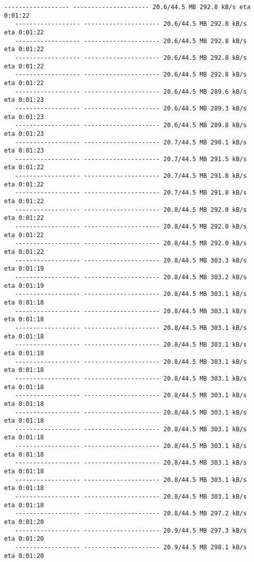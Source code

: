 \documentclass[11pt]{article}
\begin{document}
\begin{Verbatim}[commandchars=\\\{\}]
   ------------------ --------------------- 20.6/44.5 MB 292.8 kB/s eta 0:01:22
   ------------------ --------------------- 20.6/44.5 MB 292.8 kB/s eta 0:01:22
   ------------------ --------------------- 20.6/44.5 MB 292.8 kB/s eta 0:01:22
   ------------------ --------------------- 20.6/44.5 MB 292.8 kB/s eta 0:01:22
   ------------------ --------------------- 20.6/44.5 MB 292.8 kB/s eta 0:01:22
   ------------------ --------------------- 20.6/44.5 MB 289.6 kB/s eta 0:01:23
   ------------------ --------------------- 20.6/44.5 MB 289.3 kB/s eta 0:01:23
   ------------------ --------------------- 20.6/44.5 MB 289.8 kB/s eta 0:01:23
   ------------------ --------------------- 20.7/44.5 MB 290.1 kB/s eta 0:01:23
   ------------------ --------------------- 20.7/44.5 MB 291.5 kB/s eta 0:01:22
   ------------------ --------------------- 20.7/44.5 MB 291.8 kB/s eta 0:01:22
   ------------------ --------------------- 20.7/44.5 MB 291.8 kB/s eta 0:01:22
   ------------------ --------------------- 20.8/44.5 MB 292.0 kB/s eta 0:01:22
   ------------------ --------------------- 20.8/44.5 MB 292.0 kB/s eta 0:01:22
   ------------------ --------------------- 20.8/44.5 MB 292.0 kB/s eta 0:01:22
   ------------------ --------------------- 20.8/44.5 MB 303.3 kB/s eta 0:01:19
   ------------------ --------------------- 20.8/44.5 MB 303.2 kB/s eta 0:01:19
   ------------------ --------------------- 20.8/44.5 MB 303.1 kB/s eta 0:01:18
   ------------------ --------------------- 20.8/44.5 MB 303.1 kB/s eta 0:01:18
   ------------------ --------------------- 20.8/44.5 MB 303.1 kB/s eta 0:01:18
   ------------------ --------------------- 20.8/44.5 MB 303.1 kB/s eta 0:01:18
   ------------------ --------------------- 20.8/44.5 MB 303.1 kB/s eta 0:01:18
   ------------------ --------------------- 20.8/44.5 MB 303.1 kB/s eta 0:01:18
   ------------------ --------------------- 20.8/44.5 MB 303.1 kB/s eta 0:01:18
   ------------------ --------------------- 20.8/44.5 MB 303.1 kB/s eta 0:01:18
   ------------------ --------------------- 20.8/44.5 MB 303.1 kB/s eta 0:01:18
   ------------------ --------------------- 20.8/44.5 MB 303.1 kB/s eta 0:01:18
   ------------------ --------------------- 20.8/44.5 MB 303.1 kB/s eta 0:01:18
   ------------------ --------------------- 20.8/44.5 MB 303.1 kB/s eta 0:01:18
   ------------------ --------------------- 20.8/44.5 MB 303.1 kB/s eta 0:01:18
   ------------------ --------------------- 20.8/44.5 MB 297.2 kB/s eta 0:01:20
   ------------------ --------------------- 20.9/44.5 MB 297.3 kB/s eta 0:01:20
   ------------------ --------------------- 20.9/44.5 MB 298.1 kB/s eta 0:01:20

\end{Verbatim}
\end{document}
